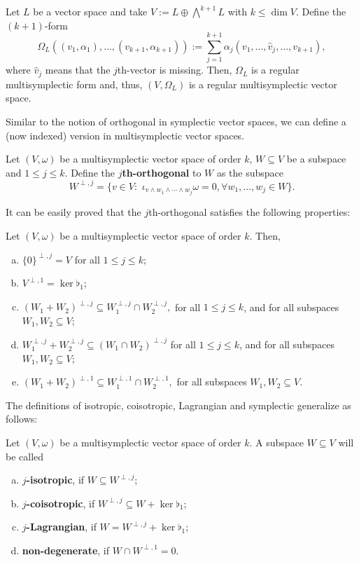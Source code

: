 \begin{example}\label{ex:canonicalmultisymplectic}Let $L$ be a vector space and take $V := L \oplus \bigwedge^{k+1} L$ with $k \leq \dim V$. Define the $(k +1)$-form $$\Omega_L ((v_1, \alpha_1), \dots, (v_{k+1}, \alpha_{k+1})) := \sum_{j = 1}^{k+1} \alpha_j(v_1, \dots, \hat{v}_j, \dots, v_{k+1}),$$ where $\hat{v}_j$ means that the $j$th-vector is missing. Then, $\Omega_L$ is a regular multisymplectic form and, thus, $(V, \Omega_L)$ is a regular multisymplectic vector space. 
\end{example}

Similar to the notion of orthogonal in symplectic vector spaces, we can define a (now indexed) version in multisymplectic vector spaces.
\begin{Def} Let $(V, \omega)$ be a multisymplectic vector space of order $k$, $W \subseteq V$ be a subspace and $1 \leq j \leq k$. Define the ${j}$\textbf{th-orthogonal} to $W$ as the subspace $$W^{\perp, j} = \{v \in V : \,\, \iota_{v \wedge w_1 \wedge \cdots \wedge w_j} \omega = 0, \forall w_1, \dots, w_j \in W\}.$$
\end{Def}
It can be easily proved that the $j$th-orthogonal satisfies the following properties:
\begin{proposition}\label{prop: propertiesoforthogonal} Let $(V, \omega)$ be a multisymplectic vector space of order $k$. Then,
\begin{enumerate}[a)]
    \item $\{0\}^{\perp, j} = V$ for all $1 \leq j \leq k$;
    \item $V^{\perp, 1} = \ker \flat_1$;
    \item $(W_1 + W_2)^{\perp, j} \subseteq W_1^{\perp, j} \cap W_2^{\perp, j},$ for all $1 \leq j \leq k$, and for all subspaces $W_1, W_2 \subseteq V$;
    \item $W_1^{\perp, j} + W_2^{\perp, j} \subseteq (W_1 \cap W_2)^{\perp, j}$ for all $1 \leq j \leq k$, and for all subspaces $W_1, W_2 \subseteq V$;
    \item $(W_1 + W_2)^{\perp, 1} \subseteq W_1^{\perp, 1} \cap W_2^{\perp, 1},$ for all subspaces $W_1, W_2 \subseteq V$.
\end{enumerate}
\end{proposition}
The definitions of isotropic, coisotropic, Lagrangian and symplectic generalize as follows:
\begin{Def} Let $(V, \omega)$ be a multisymplectic vector space of order $k$. A subspace $W \subseteq V$ will be called
\begin{enumerate}[a)]
    \item $j$\textbf{-isotropic}, if $W \subseteq W^{\perp, j}$;
    \item $j$\textbf{-coisotropic}, if $W^{\perp, j} \subseteq W + \ker \flat_1$;
    \item $j$\textbf{-Lagrangian}, if $W = W^{\perp, j} + \ker \flat_1$;
    \item \textbf{non-degenerate}, if $W \cap W^{\perp, 1} = 0.$
\end{enumerate}
\end{Def}
